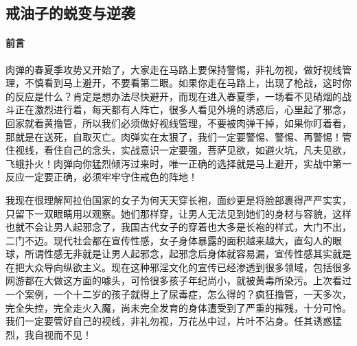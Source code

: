 \subsection{戒油子的蜕变与逆袭}

\paragraph*{前言}

肉弹的春夏季攻势又开始了，大家走在马路上要保持警惕，非礼勿视，做好视线管理，不慎看到马上避开，不要看第二眼。如果你走在马路上，出现了枪战，这时你的反应是什么？肯定是想办法尽快避开，而现在进入春夏季，一场看不见硝烟的战斗正在激烈进行着，每天都有人阵亡，很多人看见外境的诱惑后，心里起了邪念，回家就看黄撸管，所以我们必须做好视线管理，不要被肉弹干掉，如果你盯着看，那就是在送死，自取灭亡。肉弹实在太狠了，我们一定要警惕、警惕、再警惕！管住视线，看住自己的念头，实战意识一定要强，菩萨见欲，如避火坑，凡夫见欲，飞蛾扑火！肉弹向你猛烈倾泻过来时，唯一正确的选择就是马上避开，实战中第一反应一定要正确，必须牢牢守住戒色的阵地！

我现在很理解阿拉伯国家的女子为何天天穿长袍，面纱更是将脸部裹得严严实实，只留下一双眼睛用以观察。她们那样穿，让男人无法见到她们的身材与容貌，这样也就不会让男人起邪念了，我国古代女子的穿着也大多是长袍的样式，大门不出，二门不迈。现代社会都在宣传性感，女子身体暴露的面积越来越大，直勾人的眼球，所谓性感无非就是让男人起邪念，起邪念后身体就容易漏，宣传性感其实就是在把大众导向纵欲主义。现在这种邪淫文化的宣传已经渗透到很多领域，包括很多网游都在大做这方面的噱头，可怜很多孩子年纪尚小，就被黄毒所染污。上次看过一个案例，一个十二岁的孩子就得上了尿毒症，怎么得的？疯狂撸管，一天多次，完全失控，完全走火入魔，尚未完全发育的身体遭受到了严重的摧残，十分可怜。我们一定要管好自己的视线，非礼勿视，万花丛中过，片叶不沾身。任其诱惑猛烈，我自视而不见！

